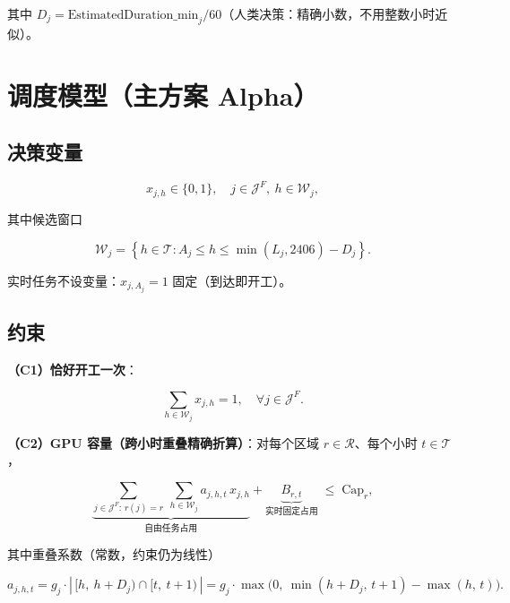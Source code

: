 \documentclass{internal-report}
\begin{document}
其中 $D_j = \text{EstimatedDuration\_min}_j / 60$（人类决策：精确小数，不用整数小时近似）。

\section{调度模型（主方案 Alpha）}

\subsection{决策变量}

\begin{equation}
  x_{j,h} \in \{0,1\},\quad j \in \mathcal{J}^{F},\ h \in \mathcal{W}_j,
  \label{eq:decisionvar}
\end{equation}

其中候选窗口

\begin{equation}
  \mathcal{W}_j = \left\{ h \in \mathcal{T} : A_j \le h \le \min(L_j,2406) - D_j \right\}.
  \label{eq:window}
\end{equation}

实时任务不设变量：$x_{j,A_j}=1$ 固定（到达即开工）。

\subsection{约束}

\textbf{（C1）恰好开工一次}：

\begin{equation}
  \sum_{h \in \mathcal{W}_j} x_{j,h} = 1,\quad \forall j \in \mathcal{J}^{F}.
  \label{eq:c1}
\end{equation}

\textbf{（C2）GPU 容量（跨小时重叠精确折算）}：对每个区域 $r \in \mathcal{R}$、每个小时 $t \in \mathcal{T}$，

\begin{equation}
  \underbrace{\sum_{j \in \mathcal{J}^{F}:\, r(j)=r} \ \sum_{h \in \mathcal{W}_j} a_{j,h,t}\, x_{j,h}}_{\text{自由任务占用}}
  + \underbrace{B_{r,t}}_{\text{实时固定占用}}
  \;\le\; \text{Cap}_r,
  \label{eq:c2}
\end{equation}

其中重叠系数（常数，约束仍为线性）

\begin{equation}
  a_{j,h,t} = g_j \cdot \left|\,[h,\ h+D_j) \cap [t,\ t+1)\,\right|
  = g_j \cdot \max\!\big(0,\ \min(h+D_j,\, t+1) - \max(h,\, t)\big).
  \label{eq:overlap}
\end{equation}
\end{document}

